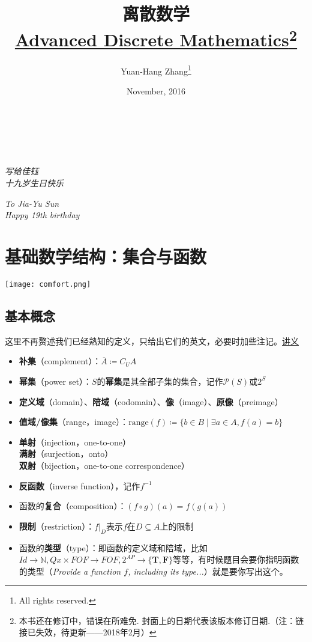 \documentclass[b5paper,oneside]{ctexbook}
\title{\textbf{离散数学}\\\href{http://learningtolearn.me/books/advanced_discrete}{Advanced Discrete Mathematics}\footnote{本书还在修订中，错误在所难免. 封面上的日期代表该版本修订日期.（注：链接已失效，待更新——2018年2月）}}
\date{November, 2016}
\author{Yuan-Hang Zhang\footnote{\textcopyright{} All rights reserved.}}
\begin{document}
\maketitle
\chapter*{\ }
\thispagestyle{empty}
    \null{}
        \begin{flushright}
               \large \emph{写给佳钰\\十九岁生日快乐}

\large \emph{To Jia-Yu Sun\\Happy 19th birthday}
        \end{flushright}
\null

\tableofcontents
\chapter{基础数学结构：集合与函数}
\vspace*{\fill}
\begin{center}
\texttt{[image: comfort.png]}
\end{center}
\vspace*{\fill}
\clearpage
\section{基本概念}
这里不再赘述我们已经熟知的定义，只给出它们的英文，必要时加些注记。\href{http://iscasmc.ios.ac.cn/DM2016/annotated2.pdf}{讲义}

\begin{itemize}
\item \textbf{补集}（complement）：$\overline{A}\coloneqq C_UA$
\item \textbf{幂集}（power set）：$S$的\textbf{幂集}是其全部子集的集合，记作$\mathcal{P}(S)$或$2^S$
\item \textbf{定义域}（domain）、\textbf{陪域}（codomain）、\textbf{像}（image）、\textbf{原像}（preimage）
\item \textbf{值域/像集}（range，image）：$\mathrm{range}(f)\coloneqq\{b\in B\mid\exists a\in A,f(a)=b\}$
\item \textbf{单射}（injection，one-to-one）\\\textbf{满射}（surjection，onto）\\\textbf{双射}（bijection，one-to-one correspondence）
\item \textbf{\textbf{反函数}}（inverse function），记作$f^{-1}$
\item 函数的\textbf{复合}（composition）：$(f\circ g)(a)=f(g(a))$
\item \textbf{限制}（restriction）：$f|_D$表示$f$在$D\subseteq A$上的限制
\item 函数的\textbf{类型}（type）：即函数的定义域和陪域，比如$Id\to\mathbb{N},Qx\times FOF\to FOF ,2^{AP}\to\{\mathbf{T},\mathbf{F}\}$等等，有时候题目会要你指明函数的类型（\emph{Provide a function $f$, including its type...}）就是要你写出这个。
\end{itemize}
\end{document}
